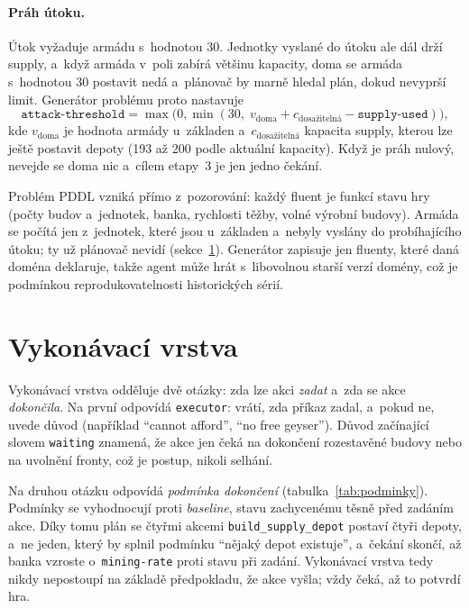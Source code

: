 \paragraph{Práh útoku.} Útok vyžaduje armádu s~hodnotou 30. Jednotky vyslané do útoku ale dál drží supply, a~když armáda v~poli zabírá většinu kapacity, doma se armáda s~hodnotou 30 postavit nedá a~plánovač by marně hledal plán, dokud nevyprší limit. Generátor problému proto nastavuje
\[
	\texttt{attack-threshold} = \max\big(0, \min(30,\; v_{\mathrm{doma}} + c_{\mathrm{dosažitelná}} - \texttt{supply-used})\big),
\]
kde $v_{\mathrm{doma}}$ je hodnota armády u~základen a~$c_{\mathrm{dosažitelná}}$ kapacita supply, kterou lze ještě postavit depoty (193 až 200 podle aktuální kapacity). Když je práh nulový, nevejde se doma nic a~cílem etapy~3 je jen jedno čekání.

Problém PDDL vzniká přímo z~pozorování: každý fluent je funkcí stavu hry (počty budov a~jednotek, banka, rychlosti těžby, volné výrobní budovy). Armáda se počítá jen z~jednotek, které jsou u~základen a~nebyly vyslány do probíhajícího útoku; ty už plánovač nevidí (sekce~\ref{sec:vykonavani}). Generátor zapisuje jen fluenty, které daná doména deklaruje, takže agent může hrát s~libovolnou starší verzí domény, což je podmínkou reprodukovatelnosti historických sérií.

\section{Vykonávací vrstva}
\label{sec:vykonavani}

Vykonávací vrstva odděluje dvě otázky: zda lze akci \emph{zadat} a~zda se akce \emph{dokončila}. Na první odpovídá \texttt{executor}: vrátí, zda příkaz zadal, a~pokud ne, uvede důvod (například \enquote{cannot afford}, \enquote{no free geyser}). Důvod začínající slovem \texttt{waiting} znamená, že akce jen čeká na dokončení rozestavěné budovy nebo na uvolnění fronty, což je postup, nikoli selhání.

Na druhou otázku odpovídá \emph{podmínka dokončení} (tabulka~\ref{tab:podminky}). Podmínky se vyhodnocují proti \emph{baseline}, stavu zachycenému těsně před zadáním akce. Díky tomu plán se čtyřmi akcemi \texttt{build\_supply\_depot} postaví čtyři depoty, a~ne jeden, který by splnil podmínku \enquote{nějaký depot existuje}, a~čekání skončí, až banka vzroste o~\texttt{mining-rate} proti stavu při zadání. Vykonávací vrstva tedy nikdy nepostoupí na základě předpokladu, že akce vyšla; vždy čeká, až to potvrdí hra.


